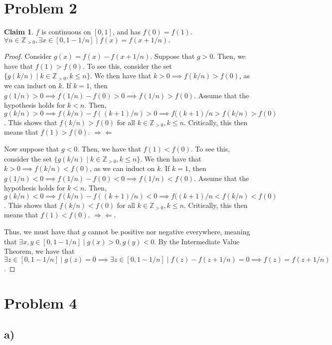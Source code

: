 \documentclass[12pt,letterpaper]{article}
\theoremstyle{definition}
\newtheorem*{claim}{Claim}
\newcommand{\contra}{\Rightarrow\!\Leftarrow}
\newcommand{\Zg}{\mathbb{Z}_{>0}}
\begin{document}
\begin{proofof}
\section*{Problem 2}

\begin{claim}
  $f$ is continuous on $[0,1]$, and has $f(0) = f(1)$. $\forall n \in \Zg,
  \exists x \in [0,1 - 1/n] \mid f(x) = f(x + 1/n).$
\end{claim}

\begin{proof}
  Consider $g(x) = f(x) - f(x + 1/n)$. Suppose that $g > 0$. Then, we have that
  $f(1) > f(0)$. To see this, consider the set $\{ g(k/n) \mid k \in \Zg, k \leq
  n\}.$ We then have that $k > 0 \implies f(k/n) > f(0)$, as we can induct on
  $k$. If $k = 1$, then $g(1/n) > 0 \implies f(1/n) - f(0) > 0 \implies f(1/n) >
  f(0)$. Assume that the hypothesis holds for $k < n$. Then, $g(k/n) > 0
  \implies f(k/n) - f((k+1)/n) > 0 \implies f((k+1)/n > f(k/n) > f(0)$. This
  shows that $f(k/n) > f(0)$ for all $k \in \Zg, k \leq n$. Critically, this
  then means that $f(1) > f(0)$. $\contra$

  Now suppose that $g < 0$. Then, we have that
  $f(1) < f(0)$. To see this, consider the set $\{ g(k/n) \mid k \in \Zg, k \leq
  n\}.$ We then have that $k > 0 \implies f(k/n) < f(0)$, as we can induct on
  $k$. If $k = 1$, then $g(1/n) < 0 \implies f(1/n) - f(0) < 0 \implies f(1/n) <
  f(0)$. Assume that the hypothesis holds for $k < n$. Then, $g(k/n) < 0
  \implies f(k/n) - f((k+1)/n) < 0 \implies f((k+1)/n < f(k/n) < f(0)$. This
  shows that $f(k/n) < f(0)$ for all $k \in \Zg, k \leq n$. Critically, this
  then means that $f(1) < f(0)$. $\contra$.

  Thus, we must have that $g$ cannot be positive nor negative everywhere,
  meaning that $\exists x,y \in [0, 1-1/n] \mid g(x) > 0, g(y) < 0$. By the
  Intermediate Value Theorem, we have that $\exists z \in [0, 1-1/n] \mid g(z) =
  0 \implies \exists z \in [0,1-1/n] \mid f(z) - f(z + 1/n) = 0 \implies f(z) =
  f(z + 1/n)$.
\end{proof}

\section*{Problem 4}

\subsection*{a)}


\end{proofof}
\end{document}
